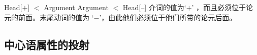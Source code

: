 \eal
\ex\label{lp-ini-arg} 
Head[\initial$+$] $<$ Argument
\ex 
Argument $<$ Head[\initial --]
\zl
介词的\initial 值为`$+$' ，而且必须位于论元的前面。末尾动词的值为 `$-$'，由此他们必须位于他们所带的论元后面。
\eal
{}
\ex[*]{
\gll {}[[den Schrank] in]\\
     \hspaceThis{[[}\textsc{det} 壁橱 \textsc{prep}\\
}
\zl

\subsection{中心语属性的投射}
\label{Abschnitt-Kopfeigenschaften}

